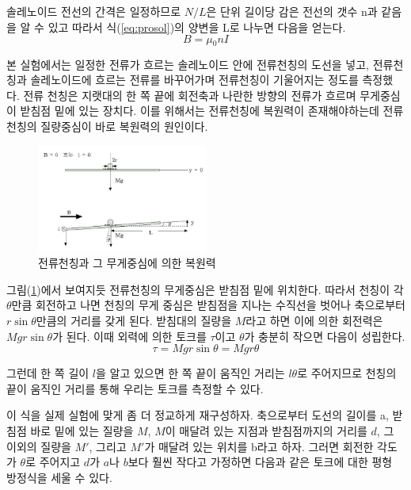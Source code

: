 \documentclass[a4paper]{article}
\begin{document}
	솔레노이드 전선의 간격은 일정하므로 $N/L$은 단위 길이당 감은 전선의 갯수 n과 같음을 알 수 있고 따라서 식(\ref{eq:prosol})의 양변을 L로 나누면 다음을 얻는다.
	\begin{equation}
		B = \mu{}_{0}nI
		\label{eq:sol}
	\end{equation}

	본 실험에서는 일정한 전류가 흐르는 솔레노이드 안에 전류천칭의 도선을 넣고, 전류천칭과 솔레노이드에 흐르는 전류를 바꾸어가며 전류천칭이 기울어지는 정도를 측정했다.
	전류 천칭은 지랫대의 한 쪽 끝에 회전축과 나란한 방향의 전류가 흐르며 무게중심이 받침점 밑에 있는 장치다.
	이를 위해서는 전류천칭에 복원력이 존재해야하는데 전류천칭의 질량중심이 바로 복원력의 원인이다.
	\begin{figure}
		\centering
		\includegraphics[width=0.5\textwidth]{img/chunching.png}
		\caption{전류천칭과 그 무게중심에 의한 복원력}
		\label{fig:chunching}
	\end{figure}

	그림(\ref{fig:chunching})에서 보여지듯 전류천칭의 무게중심은 받침점 밑에 위치한다.
	따라서 천칭이 각$\theta$만큼 회전하고 나면 천칭의 무게 중심은 받침점을 지나는 수직선을 벗어나 축으로부터 $r\sin{\theta}$만큼의 거리를 갖게 된다.
	받침대의 질량을 $M$라고 하면 이에 의한 회전력은 $Mgr\sin{\theta}$가 된다.
	이때 외력에 의한 토크를 $\tau$이고 $\theta$가 충분히 작으면 다음이 성립한다.
	\begin{equation}
		\tau = Mgr\sin{\theta} = Mgr\theta
	\end{equation}

	그런데 한 쪽 길이 $l$을 알고 있으면 한 쪽 끝이 움직인 거리는 $l\theta$로 주어지므로 천칭의 끝이 움직인 거리를 통해 우리는 토크를 측정할 수 있다.

	이 식을 실제 실험에 맞게 좀 더 정교하게 재구성하자.
	축으로부터 도선의 길이를 a, 받침점 바로 밑에 있는 질량을 $M$, $M$이 매달려 있는 지점과 받침점까지의 거리를 $d$, 그 이외의 질량을 $M'$, 그리고 $M'$가 매달려 있는 위치를 b라고 하자.
	그러면 회전한 각도가 $\theta$로 주어지고 $d$가 $a$나 $b$보다 훨씬 작다고 가정하면 다음과 같은 토크에 대한 평형 방정식을 세울 수 있다.
\end{document}
